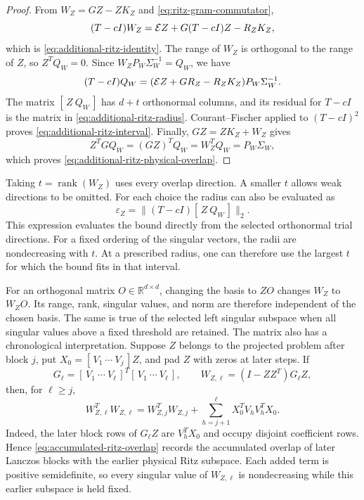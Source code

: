 \documentclass[11pt]{article}
\theoremstyle{definition}
\newcommand{\R}{\mathbb{R}}
\begin{document}
\begin{proof}
From $W_Z=GZ-ZK_Z$ and \eqref{eq:ritz-gram-commutator},
\[
 (T-cI)W_Z
 ={\cal E}Z+G(T-cI)Z-R_ZK_Z,
\]
which is \eqref{eq:additional-ritz-identity}.  The range of $W_Z$ is
orthogonal to the range of $Z$, so $Z^TQ_W=0$.  Since
$W_ZP_W\Sigma_W^{-1}=Q_W$, we have
\[
 (T-cI)Q_W
 =({\cal E}Z+GR_Z-R_ZK_Z)P_W\Sigma_W^{-1}.
\]
The matrix $[\,Z\ Q_W\,]$ has $d+t$ orthonormal columns, and its residual
for $T-cI$ is the matrix in \eqref{eq:additional-ritz-radius}.
Courant--Fischer applied to $(T-cI)^2$ proves
\eqref{eq:additional-ritz-interval}.  Finally,
$GZ=ZK_Z+W_Z$ gives
\[
 Z^TGQ_W=(GZ)^TQ_W=W_Z^TQ_W=P_W\Sigma_W,
\]
which proves \eqref{eq:additional-ritz-physical-overlap}.
\end{proof}

Taking $t=\operatorname{rank}(W_Z)$ uses every overlap direction.  A smaller
$t$ allows weak directions to be omitted.  For each choice the radius can
also be evaluated as
\[
 \varepsilon_Z=\|(T-cI)[\,Z\ Q_W\,]\|_2.
\]
This expression evaluates the bound directly from the selected orthonormal
trial directions.  For a fixed ordering of the singular vectors, the radii
are nondecreasing with $t$.
At a prescribed radius, one can therefore use the largest $t$ for which
the bound fits in that interval.

For an orthogonal matrix $O\in\R^{d\times d}$, changing the basis to $ZO$
changes $W_Z$ to $W_ZO$.  Its range,
rank, singular values, and norm are therefore independent of the chosen
basis.  The same is true of the selected left singular subspace when all
singular values above a fixed threshold are retained.  The matrix also has a
chronological interpretation.  Suppose $Z$
belongs to the projected problem after block
$j$, put $X_0=[\,V_1\ \cdots\ V_j\,]Z$, and pad $Z$ with zeros at later
steps.  If
\[
 G_\ell=[\,V_1\ \cdots\ V_\ell\,]^T
          [\,V_1\ \cdots\ V_\ell\,],
 \qquad
 W_{Z,\ell}=(I-ZZ^T)G_\ell Z,
\]
then, for $\ell\ge j$,
\begin{equation}
 W_{Z,\ell}^TW_{Z,\ell}
 =W_{Z,j}^TW_{Z,j}
  +\sum_{h=j+1}^{\ell}X_0^TV_hV_h^TX_0.
 \label{eq:accumulated-ritz-overlap}
\end{equation}
Indeed, the later block rows of $G_\ell Z$ are $V_h^TX_0$ and occupy
disjoint coefficient rows.  Hence
\eqref{eq:accumulated-ritz-overlap} records the accumulated overlap of later
Lanczos blocks with the earlier physical Ritz subspace.  Each added term is
positive semidefinite, so every singular value of $W_{Z,\ell}$ is
nondecreasing while this earlier subspace is held fixed.
\end{document}
